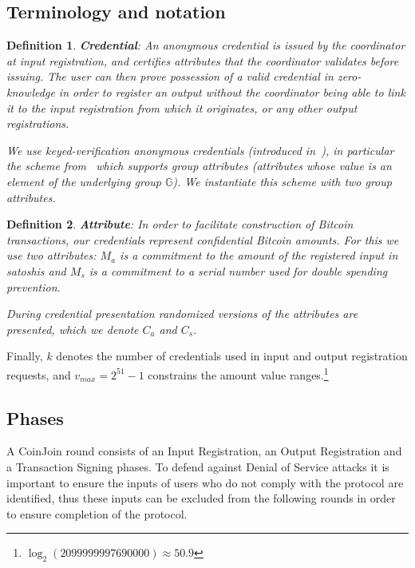 \documentclass{article}
\newtheorem{definition}{Definition}[section]
\begin{document}
\subsection{Terminology and notation}

\begin{definition} \textbf{Credential}:
An anonymous credential is issued by the coordinator at input registration, and certifies attributes that the coordinator validates before issuing. The user can then prove possession of a valid credential in zero-knowledge in order to register an output without the coordinator being able to link it to the input registration from which it originates, or any other output registrations.

We use keyed-verification anonymous credentials (introduced in~\cite{chase2014algebraic}), in particular the scheme from~\cite{chase2019signal} which supports group attributes (attributes whose value is an element of the underlying group $\mathbb{G}$). We instantiate this scheme with two group attributes.
\end{definition}

\begin{definition}\textbf{Attribute}:
In order to facilitate construction of Bitcoin transactions, our credentials represent confidential Bitcoin amounts. For this we use two attributes: $M_a$ is a commitment to the amount of the registered input in satoshis and $M_s$ is a commitment to a serial number used for double spending prevention.

During credential presentation randomized versions of the attributes are presented, which we denote $C_a$ and $C_s$.
\end{definition}

Finally, $k$ denotes the number of credentials used in input and output registration requests, and $v_{\mathit{max}} = 2^{51}-1$ constrains the amount value ranges.\footnote{$\log_2(2099999997690000) \approx 50.9$}

\subsection{Phases}

A CoinJoin round consists of an Input Registration, an Output Registration and a Transaction Signing phases. To defend against Denial of Service attacks it is important to ensure the inputs of users who do not comply with the protocol are identified, thus these inputs can be excluded from the following rounds in order to ensure completion of the protocol.
\end{document}
